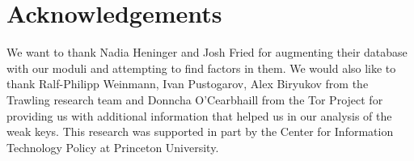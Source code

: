 \section*{Acknowledgements}
We want to thank Nadia Heninger and Josh Fried for augmenting their database
with our moduli and attempting to find factors in them. We would also like to
thank Ralf-Philipp Weinmann, Ivan Pustogarov, Alex Biryukov from the Trawling
research team and Donncha O'Cearbhaill from the Tor Project for providing us
with additional information that helped us in our analysis of the weak keys.
This research was supported in part by the Center for Information Technology
Policy at Princeton University.
